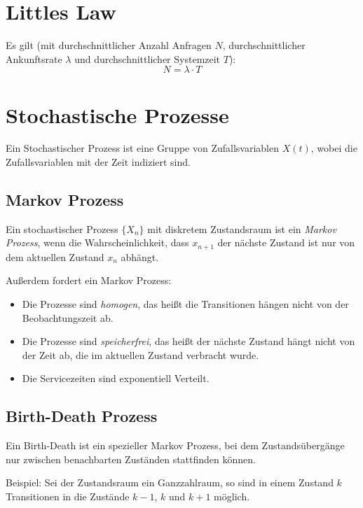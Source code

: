 	\section{Littles Law}
		Es gilt (mit durchschnittlicher Anzahl Anfragen \(N\), durchschnittlicher Ankunftsrate \(\lambda\) und durchschnittlicher Systemzeit \(T\)):
		\begin{equation*}
			N = \lambda \cdot T
		\end{equation*}
        
	\section{Stochastische Prozesse}
		Ein Stochastischer Prozess ist eine Gruppe von Zufallsvariablen \( X(t) \), wobei die Zufallsvariablen mit der Zeit indiziert sind.
		
		\subsection{Markov Prozess}
			Ein stochastischer Prozess \( \{ X _ n \} \) mit diskretem Zustandsraum ist ein \textit{Markov Prozess}, wenn die Wahrscheinlichkeit, dass \( x _ {n + 1} \) der nächste Zustand ist nur von dem aktuellen Zustand \( x _ n \) abhängt.
			
			Außerdem fordert ein Markov Prozess:
			\begin{itemize}
				\item Die Prozesse sind \textit{homogen}, das heißt die Transitionen hängen nicht von der Beobachtungszeit ab.
				\item Die Prozesse sind \textit{speicherfrei}, das heißt der nächste Zustand hängt nicht von der Zeit ab, die im aktuellen Zustand verbracht wurde.
				\item Die Servicezeiten sind exponentiell Verteilt.
			\end{itemize}
		
		\subsection{Birth-Death Prozess} %
			Ein Birth-Death ist ein spezieller Markov Prozess, bei dem Zustandsübergänge nur zwischen benachbarten Zuständen stattfinden können.
			
			Beispiel: Sei der Zustandsraum ein Ganzzahlraum, so sind in einem Zustand \( k \) Transitionen in die Zustände \( k - 1 \), \( k \) und \( k + 1 \) möglich.
			
